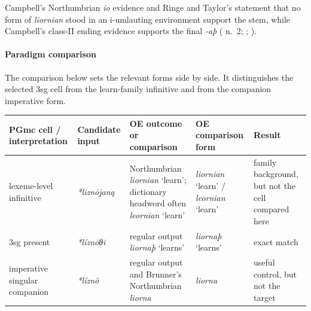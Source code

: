 \documentclass[
  british,
  a4paper,
]{article}
\newcounter{none} %
\begin{document}
Campbell's Northumbrian \emph{io} evidence and Ringe and Taylor's
statement that no form of \emph{liornian} stood in an i-umlauting
environment support the stem, while Campbell's class-II ending evidence
supports the final \emph{-aþ} ( n.~2; ; ).

\paragraph{Paradigm comparison}\label{paradigm-comparison-22}

The comparison below sets the relevant forms side by side. It
distinguishes the selected 3sg cell from the learn-family infinitive and
from the companion imperative form.

{\def\LTcaptype{none} %
\begin{longtable}[]{@{}
  >{\raggedright\arraybackslash}p{}
  >{\raggedright\arraybackslash}p{}
  >{\raggedright\arraybackslash}p{}
  >{\raggedright\arraybackslash}p{}
  >{\raggedright\arraybackslash}p{}@{}}
\toprule\noalign{}
\begin{minipage}[b]{\linewidth}\raggedright
PGmc cell / interpretation
\end{minipage} & \begin{minipage}[b]{\linewidth}\raggedright
Candidate input
\end{minipage} & \begin{minipage}[b]{\linewidth}\raggedright
OE outcome or comparison
\end{minipage} & \begin{minipage}[b]{\linewidth}\raggedright
OE comparison form
\end{minipage} & \begin{minipage}[b]{\linewidth}\raggedright
Result
\end{minipage} \\
\midrule\noalign{}
\endhead
\bottomrule\noalign{}
\endlastfoot
lexeme-level infinitive & {\emph{*liznōjaną}} & Northumbrian
{\emph{liornian}} `learn'; dictionary headword often {\emph{leornian}}
`learn' & {\emph{liornian}} `learn' / {\emph{leornian}} `learn' & family
background, but not the cell compared here \\
3sg present & {\emph{*líznōθi}} & regular output {\emph{liornaþ}}
`learns' & {\emph{liornaþ}} `learns' & exact match \\
imperative singular companion & {\emph{*líznô}} & regular output and
Brunner's Northumbrian {\emph{liorna}} & {\emph{liorna}} & useful
control, but not the target \\
\end{longtable}
}
\end{document}
